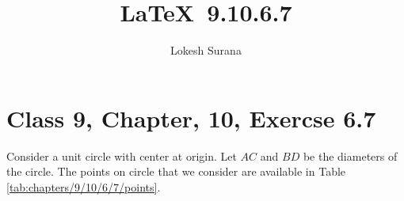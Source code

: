 \documentclass[journal,12pt,twocolumn]{IEEEtran}
\begin{document}
\vspace{3cm}
\title{\LaTeX\ 9.10.6.7}
\author{Lokesh Surana}
\maketitle
\section*{Class 9, Chapter, 10, Exercse 6.7}


\solution
\fi
Consider a unit circle with center at origin.
Let $AC$ and $BD$ be the diameters of the circle.
The points on circle that we consider are available in Table \eqref{tab:chapters/9/10/6/7/points}.
%
\begin{table}[H]

\caption{}
\label{tab:chapters/9/10/6/7/points}
\end{table}
%
\end{document}
